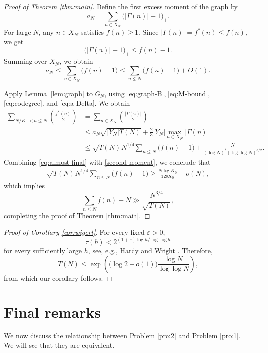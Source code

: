 \documentclass[12pt,a4paper,reqno]{amsart}
\numberwithin{equation}{section}
\theoremstyle{plain}
\theoremstyle{definition}
\begin{document}
\begin{proof}[Proof of Theorem \ref{thm:main}]
Define the first excess moment of the graph by
\[
 a_N=\sum_{n\in X_N}\big(|\Gamma(n)|-1\big)_+.
\]
For large \(N\), any \(n\in X_N\) satisfies \(f(n)\ge1\).  Since \(|\Gamma(n)|=f^*(n)\le f(n)\), we get
\[
 \big(|\Gamma(n)|-1\big)_+\le f(n)-1.
\]
Summing over \(X_N\), we obtain
\begin{equation}\label{eq:a-Delta}
 a_N\le \sum_{n\in X_N}\big(f(n)-1\big)\le \sum_{n\le N}\big(f(n)-1\big)+O(1).
\end{equation}

Apply Lemma~\ref{lem:graph} to \(G_N\), using
\eqref{eq:graph-B}, \eqref{eq:M-bound}, \eqref{eq:codegree}, and \eqref{eq:a-Delta}.  We obtain
\begin{align}\label{eq:almost-final}
 \sum_{N/K_0<n\le N}\binom{f^*(n)}2&=\sum_{n\in X_N}\binom{|\Gamma(n)|}2\nonumber\\
 &\le a_N\sqrt{|Y_N|T(N)}+\frac23|Y_N|\max_{n\in X_N}|\Gamma(n)|\nonumber\\
 &\le \sqrt{T(N)}N^{1/4}\sum_{n\le N}\big(f(n)-1\big)+\frac{N}{(\log N)^{\delta}(\log\log N)^{3/2}}.
\end{align}
Combining \eqref{eq:almost-final} with \eqref{second-moment}, we conclude that
\begin{align*}
\sqrt{T(N)}N^{1/4}\sum_{n\le N}\big(f(n)-1\big)\ge \frac{N\log K_0}{128K_0}-o(N),
\end{align*}
which implies
$$
\sum_{n\le N}f(n)-N\gg \frac{N^{3/4}}{\sqrt{T(N)}},
$$
completing the proof of Theorem \ref{thm:main}.
\end{proof}

\begin{proof}[Proof of Corollary \ref{cor:wigert}]
For every fixed \(\varepsilon>0\),
\begin{equation*}
 \tau(h)
 <2^{(1+\varepsilon)\log h/\log\log h}
\end{equation*}
for every sufficiently large \(h\), see, e.g., Hardy and Wright \cite[Chapter XVIII, \S18.1, Theorem 317, p.~262]{HW}. Therefore,
\begin{equation*}
 T(N)
 \le
 \exp\!\left(
   \big(\log 2+o(1)\big)\frac{\log N}{\log\log N}
 \right),
\end{equation*}
from which our corollary follows.
\end{proof}

\section{Final remarks}
We now discuss the relationship between Problem \ref{pro:2} and Problem \ref{pro:1}. We will see that they are equivalent.
\end{document}

